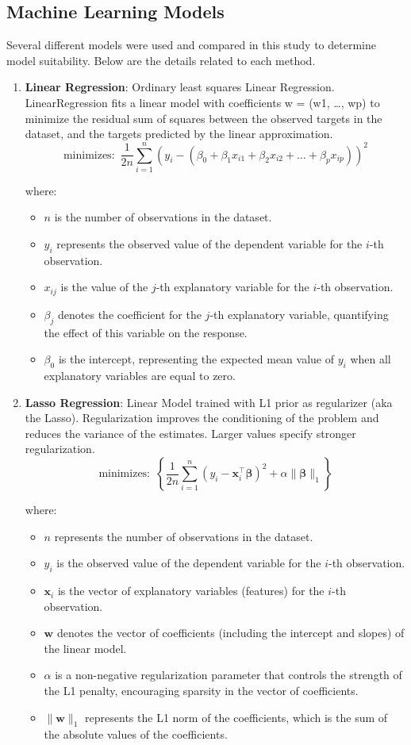 \documentclass{article}
\theoremstyle{mytheoremstyle}
\theoremstyle{mytheoremstyle}
\theoremstyle{myproblemstyle}
\begin{document}
\subsection{Machine Learning Models}
Several different models were used and compared in this study to determine model suitability. Below are the details related to each method. 
\begin{enumerate}
    \item \textbf{Linear Regression}: Ordinary least squares Linear Regression. LinearRegression fits a linear model with coefficients w = (w1, …, wp) to minimize the residual sum of squares between the observed targets in the dataset, and the targets predicted by the linear approximation.
    \[
        \text{minimizes: } \, \frac{1}{2n} \sum_{i=1}^n \left(y_i - (\beta_0 + \beta_1 x_{i1} + \beta_2 x_{i2} + \dots + \beta_p x_{ip})\right)^2\]

where:
\begin{itemize}
    \item $n$ is the number of observations in the dataset.
    \item $y_i$ represents the observed value of the dependent variable for the $i$-th observation.
    \item $x_{ij}$ is the value of the $j$-th explanatory variable for the $i$-th observation.
    \item $\beta_j$ denotes the coefficient for the $j$-th explanatory variable, quantifying the effect of this variable on the response.
    \item $\beta_0$ is the intercept, representing the expected mean value of $y_i$ when all explanatory variables are equal to zero.
\end{itemize}


    \item \textbf{Lasso Regression}: Linear Model trained with L1 prior as regularizer (aka the Lasso). Regularization improves the conditioning of the problem and reduces the variance of the estimates. Larger values specify stronger regularization.
    \[
\text{minimizes: } \, \left\{ \frac{1}{2n} \sum_{i=1}^n (y_i - \mathbf{x}_i^\top \mathbf{\beta})^2 + \alpha \|\mathbf{\beta}\|_1 \right\}
\]

where:
\begin{itemize}
    \item $n$ represents the number of observations in the dataset.
    \item $y_i$ is the observed value of the dependent variable for the $i$-th observation.
    \item $\mathbf{x}_i$ is the vector of explanatory variables (features) for the $i$-th observation.
    \item $\mathbf{w}$ denotes the vector of coefficients (including the intercept and slopes) of the linear model.
    \item $\alpha$ is a non-negative regularization parameter that controls the strength of the L1 penalty, encouraging sparsity in the vector of coefficients.
    \item $\|\mathbf{w}\|_1$ represents the L1 norm of the coefficients, which is the sum of the absolute values of the coefficients.
\end{itemize}


\end{enumerate}
\end{document}
